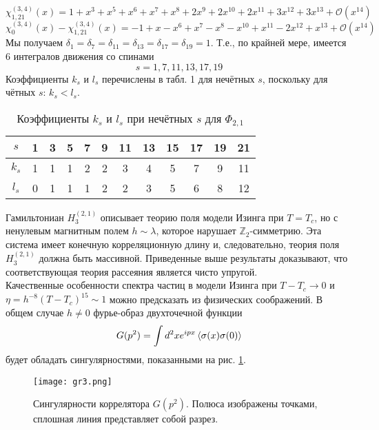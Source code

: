 \documentclass[12pt]{article}
\theoremstyle{definition}
\begin{document}
\begin{equation}
    \chi^{(3,4)}_{1,21}(x)=1+x^3+x^5+x^6+x^7+x^8+2x^9+2x^{10}+2x^{11}+3x^{12}+3x^{13}+\mathcal{O}(x^{14})
\end{equation}
\begin{equation}
    \chi^{(3,4)}_0(x)-\chi^{(3,4)}_{1,21}(x)=-1+x-x^6+x^7-x^8-x^{10}+x^{11}-2x^{12}+x^{13}+\mathcal{O}(x^{14})
\end{equation}
Мы получаем $\delta_1=\delta_7=\delta_{11}=\delta_{13}=\delta_{17}=\delta_{19}=1$. Т.е., по крайней мере, имеется 6 интегралов движения со спинами
\begin{equation}\label{eq21}
    s=1,7,11,13,17,19
\end{equation}
Коэффициенты $k_s$ и $l_s$ перечислены в табл. 1 для нечётных $s$, поскольку для чётных $s$: $k_s<l_s$.
\begin{table}[h!]
    \centering
    \begin{tabular}{|c|c|c|c|c|c|c|c|c|c|c|c|}
    \hline
        $s$ & 1 & 3 & 5 & 7 & 9 & 11 & 13 & 15 & 17 & 19 & 21\\\hline
        $k_s$ & 1 & 1 & 1 & 2 & 2 & 3 & 4 & 5 & 7 & 9 & 11\\\hline
        $l_s$ & 0 & 1 & 1 & 1 & 2 & 2 & 3 & 5 & 6 & 8 & 12\\\hline
    \end{tabular}
    \caption{Коэффициенты $k_s$ и $l_s$ при нечётных $s$ для $\Phi_{2,1}$}
    \label{tab:my_label}
\end{table}
Гамильтониан $H^{(2,1)}_3$ описывает теорию поля модели Изинга при $T=T_c$, но с ненулевым магнитным полем $h\sim\lambda$, которое нарушает $\mathbb{Z}_2$-симметрию. Эта система имеет конечную корреляционную длину и, следовательно, теория поля $H^{(2,1)}_3$ должна быть массивной. Приведенные выше результаты доказывают, что соответствующая теория рассеяния является чисто упругой.\\
Качественные особенности спектра частиц в модели Изинга при $T-T_c\rightarrow 0$ и $\eta = h^{-8}(T-T_c)^{15}\sim1$ можно предсказать из физических соображений. В общем случае $h\neq0$ фурье-образ двухточечной функции
\begin{equation}
    G(p^2)=\int d^2xe^{ipx}\braket{\sigma(x)\sigma(0)}
\end{equation}
будет обладать сингулярностями, показанными на рис. \ref{gr3}.
\begin{figure}[h!]
    \centering
    \texttt{[image: gr3.png]}
    \caption{Сингулярности коррелятора $G(p^2)$. Полюса изображены точками, сплошная линия представляет собой разрез.}
    \label{gr3}
\end{figure}\\
\end{document}
